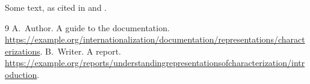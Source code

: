 \documentclass{article}
\begin{document}
Some text, as cited in \cite{guide} and \cite{report}.
\begin{thebibliography}{9}
 A.~Author. A guide to the documentation.
\url{https://example.org/internationalization/documentation/representations/characterizations}.
 B.~Writer. A report.
\url{https://example.org/reports/understandingrepresentationsofcharacterization/introduction}.
\end{thebibliography}
\end{document}
